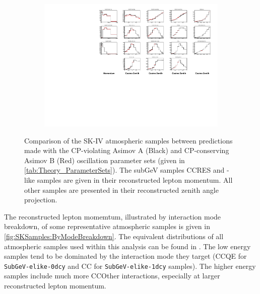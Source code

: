\begin{figure}
  \centering
  \begin{subfigure}[t]{\textwidth}
    \includegraphics[width=\textwidth, trim={0mm 0mm 0mm 0mm}, clip,page=1]{Figures/Selections/HistogramComparison.pdf}
  \end{subfigure}
  \caption{Comparison of the SK-IV atmospheric samples between predictions made with the CP-violating Asimov A (Black) and CP-conserving Asimov B (Red) oscillation parameter sets (given in \autoref{tab:Theory_ParameterSets}). The subGeV samples CCRES and -like samples are given in their reconstructed lepton momentum. All other samples are presented in their reconstructed zenith angle projection.}
  \label{fig:SelsAndSysts_AllSampleComparison}
\end{figure}

The reconstructed lepton momemtum, illustrated by interaction mode breakdown, of some representative atmospheric samples is given in \autoref{fig:SKSamples:ByModeBreakdown}. The equivalent distributions of all atmospheric samples used within this analysis can be found in \cite{t2k_tn_422}. The low energy samples tend to be dominated by the interaction mode they target (CCQE for \texttt{SubGeV-elike-0dcy} and CC\quickmath{1\pi} for \texttt{SubGeV-elike-1dcy} samples). The higher energy samples include much more CCOther interactions, especially at larger reconstructed lepton momentum.

